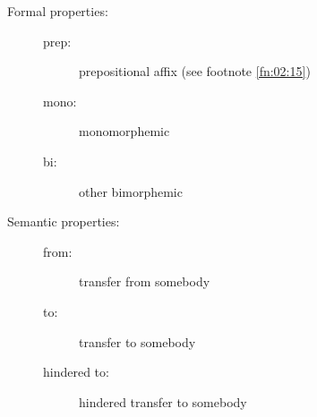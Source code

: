 \documentclass[output=paper]{langscibook}
\begin{document}
\label{falk:appendix:2}
\begin{description}
     \item[Formal properties:] 
       \begin{description}
          \item[]
          \item[prep:] prepositional affix (see footnote \ref{fn:02:15})
          \item[mono:] monomorphemic
          \item[bi:] other bimorphemic 
       \end{description}
     \item[Semantic properties:]
     \begin{description}
          \item[]
          \item[from:] transfer from somebody
          \item[to:] transfer to somebody
          \item[hindered to:] hindered transfer to somebody
      \end{description}
\end{description}
\end{document}
